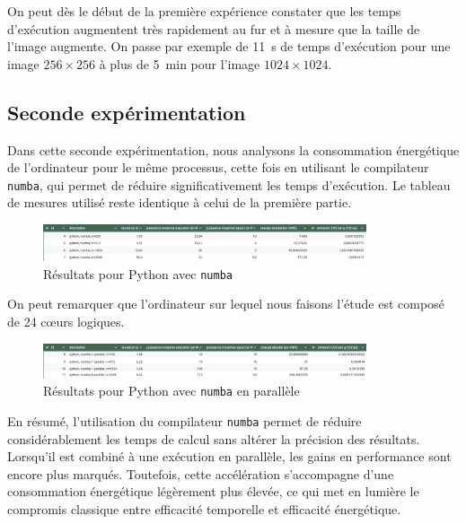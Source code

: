 On peut dès le début de la première expérience constater que les temps d’exécution augmentent très rapidement au fur et à mesure que la taille de l’image augmente. On passe par exemple de 11~s de temps d’exécution pour une image \(256 \times 256\) à plus de 5~min pour l’image \(1024 \times 1024\).

\subsection{Seconde expérimentation}

Dans cette seconde expérimentation, nous analysons la consommation énergétique de l’ordinateur pour le même processus, cette fois en utilisant le compilateur \texttt{numba}, qui permet de réduire significativement les temps d’exécution. Le tableau de mesures utilisé reste identique à celui de la première partie.


\begin{figure}[h]
    \centering
    \includegraphics[width=0.85\textwidth]{images/tableur2.png}
    \caption{Résultats pour Python avec \texttt{numba}}
\end{figure}

On peut remarquer que l’ordinateur sur lequel nous faisons l’étude est composé de 24 cœurs logiques.

\begin{figure}[h]
    \centering
    \includegraphics[width=0.85\textwidth]{images/tableur3.png}
    \caption{Résultats pour Python avec \texttt{numba} en parallèle}
\end{figure}

En résumé, l’utilisation du compilateur \texttt{numba} permet de réduire considérablement les temps de calcul sans altérer la précision des résultats. Lorsqu’il est combiné à une exécution en parallèle, les gains en performance sont encore plus marqués. Toutefois, cette accélération s’accompagne d’une consommation énergétique légèrement plus élevée, ce qui met en lumière le compromis classique entre efficacité temporelle et efficacité énergétique.

